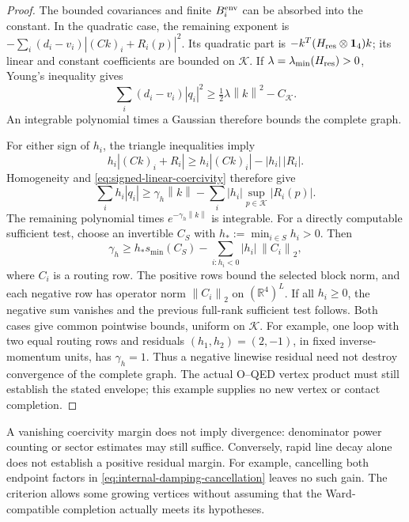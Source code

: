 \documentclass[final,5p,times,twocolumn,numbers,nopreprintline]{elsarticle}
\numberwithin{equation}{section}
\theoremstyle{definition}
\theoremstyle{remark}
\newcommand{\RR}{\mathbb R}
\newcommand{\one}{\mathbf 1}
\newcommand{\norm}[1]{\left\lVert #1\right\rVert}
\begin{document}
\begin{proof}
The bounded covariances and finite \(B_i^{\rm env}\) can be absorbed
into the constant. In the quadratic case, the remaining exponent is
\(-\sum_i(d_i-v_i)|(Ck)_i+R_i(p)|^2\). Its quadratic part is
\(-k^T(H_{\rm res}\otimes\one_4)k\); its linear and constant
coefficients are bounded on \(\mathcal K\). If
\(\lambda=\lambda_{\min}(H_{\rm res})>0\), Young's inequality gives
\begin{equation}
 \sum_i(d_i-v_i)|q_i|^2
       \geq\tfrac12\lambda\norm{k}^2-C_{\mathcal K}.
 \label{eq:residual-coercive-bound}
\end{equation}
An integrable polynomial times a Gaussian therefore bounds the
complete graph.

For either sign of \(h_i\), the triangle inequalities imply
\[
 h_i|(Ck)_i+R_i|\geq h_i|(Ck)_i|-|h_i|\,|R_i|.
\]
Homogeneity and \eqref{eq:signed-linear-coercivity} therefore give
\begin{equation}
 \sum_i h_i|q_i|\geq\gamma_h\norm{k}
       -\sum_i|h_i|\sup_{p\in\mathcal K}|R_i(p)|.
 \label{eq:signed-linear-affine-bound}
\end{equation}
The remaining polynomial times \(e^{-\gamma_h\norm{k}}\) is
integrable. For a directly computable sufficient test, choose an
invertible \(C_S\) with \(h_*:=\min_{i\in S}h_i>0\). Then
\begin{equation}
 \gamma_h\geq h_*s_{\min}(C_S)
                  -\sum_{i:h_i<0}|h_i|\,\norm{C_i}_2,
 \label{eq:signed-linear-basis-certificate}
\end{equation}
where \(C_i\) is a routing row. The positive rows bound the selected
block norm, and each negative row has operator norm \(\norm{C_i}_2\)
on \((\RR^4)^L\). If all \(h_i\geq0\), the negative sum vanishes
and the previous full-rank sufficient test follows. Both cases give
common pointwise bounds, uniform on \(\mathcal K\).
For example, one loop with two equal routing rows and residuals
\((h_1,h_2)=(2,-1)\), in fixed inverse-momentum units, has
\(\gamma_h=1\). Thus a negative linewise residual need not destroy
convergence of the complete graph. The actual O--QED vertex product
must still establish the stated envelope; this example supplies no
new vertex or contact completion.
\end{proof}

A vanishing coercivity margin does not imply divergence: denominator
power counting or sector estimates may still suffice. Conversely,
rapid line decay alone does not establish a positive residual margin.
For example, cancelling both endpoint factors in
\eqref{eq:internal-damping-cancellation} leaves no such gain.
The criterion allows some growing vertices without assuming that the
Ward-compatible completion actually meets its hypotheses.
\end{document}
